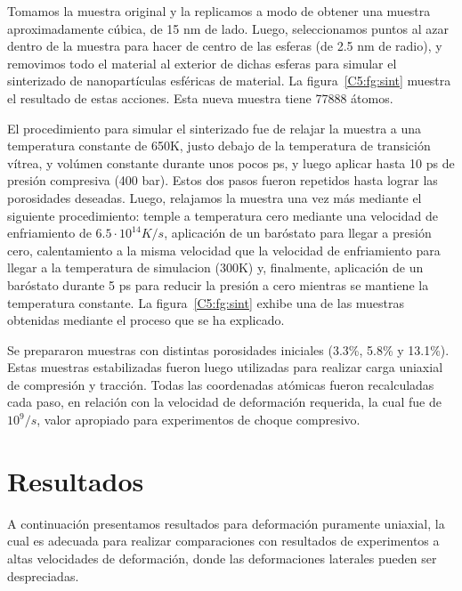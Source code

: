 Tomamos la muestra original y la replicamos a modo de obtener una muestra aproximadamente cúbica, de 15 nm de lado. Luego, seleccionamos puntos
al azar dentro de la muestra para hacer de centro de las esferas (de 2.5 nm de radio), y removimos todo el material al exterior de dichas esferas
para simular el sinterizado de nanopartículas esféricas de material. La figura~\ref{C5:fg:sint}  muestra el resultado de estas acciones. Esta
nueva muestra tiene 77888 átomos.

El procedimiento para simular el sinterizado fue de relajar la muestra a una temperatura constante de 650K, justo debajo de la temperatura
de transición vítrea, y volúmen constante durante unos pocos ps, y luego aplicar hasta 10 ps de presión compresiva (400 bar). Estos dos pasos
fueron repetidos hasta lograr las porosidades deseadas. Luego, relajamos la muestra una vez más mediante el siguiente procedimiento: temple a 
temperatura cero mediante una velocidad de enfriamiento de $6.5 \cdot 10^{14} K/s$, aplicación de un baróstato para llegar a presión
cero, calentamiento a la misma velocidad que la velocidad de enfriamiento para llegar a la temperatura de simulacion (300K) y,
finalmente, aplicación de un baróstato durante 5 ps para reducir la presión a cero mientras se mantiene la temperatura constante. La 
figura~\ref{C5:fg:sint}  exhibe una de las muestras obtenidas mediante el proceso que se ha explicado.

Se prepararon muestras con distintas porosidades iniciales (3.3\%, 5.8\% y 13.1\%). Estas muestras estabilizadas fueron luego utilizadas
para realizar carga uniaxial de compresión y tracción. Todas las coordenadas atómicas fueron recalculadas cada paso, en relación con la
velocidad de deformación requerida, la cual fue de $10^9 /s$, valor apropiado para experimentos de choque compresivo.


\section{Resultados}
\label{S5_3}

A continuación presentamos resultados para deformación puramente uniaxial, la cual es adecuada para realizar comparaciones con resultados de
experimentos a altas velocidades de deformación, donde las deformaciones laterales pueden ser despreciadas.

